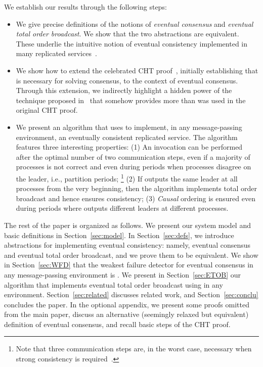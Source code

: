 \documentclass[11pt]{article}
\begin{document}
We establish our results through the following steps:


\begin{itemize}\itemsep0pt

\item We give precise definitions of the notions of {\em eventual
  consensus} and
{\em eventual total order broadcast}.
We show that the two abstractions are equivalent. These underlie 
the intuitive notion of eventual consistency implemented in many
replicated services~\cite{DeCandia2007,Cooper2008,Chang2008}.


\item We show how to extend the celebrated CHT proof~\cite{CHT96}, initially establishing
that  is necessary for solving consensus, to the context of eventual consensus.
Through this extension, we indirectly highlight a  hidden power of the
technique proposed in~\cite{CHT96} that somehow provides more
than was used in the original CHT proof.


\item We present an algorithm that uses  to implement, in any message-passing
  environment,  an eventually consistent replicated service.
The algorithm features three interesting properties:
(1) An invocation can be performed after
  the optimal number of two communication steps, even if a majority of processes is not correct and even
  during periods when processes disagree on the leader, i.e., partition
  periods; \footnote{Note that three communication steps are, in the worst case, necessary when
strong consistency is required~\cite{Lam06}. }  (2) If  outputs the same leader at all
processes from the very beginning, then the algorithm implements total
order broadcast and hence ensures consistency;
(3) \emph{Causal} ordering is ensured even during periods where
 outputs different leaders at different processes.


\end{itemize}



The rest of the paper is organized as follows.
We present our system model and basic definitions in Section~\ref{sec:model}.
In Section~\ref{sec:defs}, we introduce abstractions for
implementing
eventual consistency: namely, eventual consensus and eventual total
order broadcast, and we prove them to be equivalent.
We show in Section~\ref{sec:WFD} that the weakest failure detector for eventual consensus in any message-passing
environment is .
We present in Section~\ref{sec:ETOB} our algorithm that implements eventual total order broadcast using  in
any environment.
Section~\ref{sec:related} discusses related
work, and Section~\ref{sec:conclu} concludes the paper.
In the optional appendix, we present some proofs omitted from the main
paper, discuss an alternative (seemingly relaxed but equivalent) definition of eventual
consensus, and recall basic steps of the CHT proof.
\end{document}
